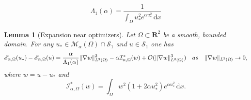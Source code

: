 \documentclass[10pt,a4paper]{amsart}
\newtheorem{lemma}{Lemma}
\newcommand{\ud}{\,\mathrm{d}}
\begin{document}
\begin{equation}\label{eq:first_TM_eigenvalue}
 \Lambda_1({\alpha})=\frac{1}{\int_{\Omega} u_*^2 e^{\alpha u_*^2} \ud x}
\end{equation}

\begin{lemma}[Expansion near optimizers]\label{lm:taylor_expansion}
Let $\Omega\subset\mathbf{R}^2$ be a smooth, bounded domain.
For any $u_*\in \mathcal{M}_\alpha(\Omega)\cap \mathcal{S}_1$ and $u\in \mathcal{S}_1$ one has 
\begin{equation} \label{eq:taylor_expansion} 
\mathscr{E}_{\alpha,\Omega} (u_*) - \mathscr{E}_{\alpha,\Omega} (u) 
= \frac{\alpha}{\Lambda_1(\alpha)} 
		\| \nabla w\|_{L^2(\Omega)}^2 - \alpha\mathcal{I}^*_{\alpha,\Omega}(w) 
        + \mathcal{O}(\|\nabla w\|_{L^2(\Omega)}^3) \quad {\rm as} \quad \|\nabla w\|_{L^{2}(\Omega)}\to0,
\end{equation} 
where $w=u-u_*$ and
\begin{equation}\label{eq:integral_error}
  \mathcal{I}^*_{\alpha,\Omega}(w)= \int_\Omega w^2(1+2\alpha u_*^2)
		e^{\alpha u_*^2} \ud x.  
\end{equation}
\end{lemma} 
\end{document}
